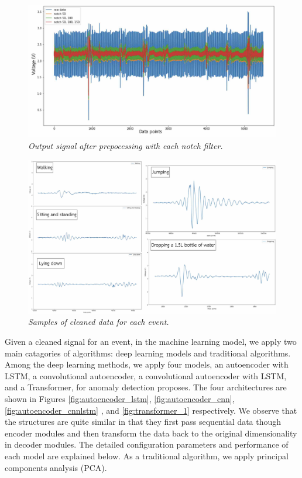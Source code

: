 \begin{figure}[H]
  \centering
  \caption[Output signal after prepocessing with each notch filter.]{\emph{Output signal after prepocessing with each notch filter.}} \label{fig:notch_filter}
  \includegraphics[scale = 0.22]{figures/notch_filter.jpg}
\end{figure}

\begin{figure}[H]
  \centering
  \caption[Samples of cleaned data for each event.]{\emph{Samples of cleaned data for each event.}} \label{fig:cleaned_data}
  \includegraphics[scale = 0.15]{figures/cleaned_data.jpg}
\end{figure}

Given a cleaned signal for an event, in the machine learning model, we apply two main catagories of algorithms: deep learning models and traditional algorithms. Among the deep learning methods, we apply four models, an autoencoder with LSTM, a convolutional autoencoder, a convolutional autoencoder with LSTM, and a Transformer, for anomaly detection proposes. The four architectures are shown in Figures \ref{fig:autoencoder_lstm}, \ref{fig:autoencoder_cnn}, \ref{fig:autoencoder_cnnlstm} , and \ref{fig:transformer_1} respectively. We observe that the structures are quite similar in that they first pass sequential data though encoder modules and then transform the data back to the original dimensionality in decoder modules. The detailed configuration parameters and performance of each model are explained below. As a traditional algorithm, we apply principal components analysis (PCA).

